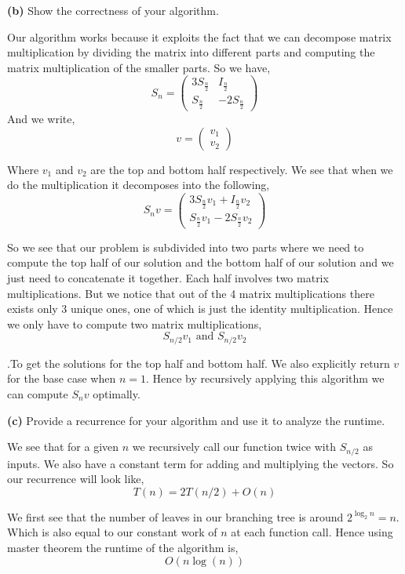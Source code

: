 \documentclass[12pt]{article}
\newcommand{\question}[3][Q]{
\begin{description}
\item \textbf{#1{#2}} #3
\end{description}
}
\begin{document}
\question[]{(b)}{
    Show the correctness of your algorithm.
}
\begin{answer}
    Our algorithm works because it exploits the fact that we can decompose matrix multiplication by dividing the matrix into different parts and computing the matrix multiplication of the smaller parts. So we have, 
    $$  $$ 
    $$S_n = \begin{pmatrix} 
        3S_{\frac{n}{2}} & I_{\frac{n}{2}} \\
        S_{\frac{n}{2}} & -2S_{\frac{n}{2}}
    \end{pmatrix}
    $$
    And we write, 
    $$ v = \begin{pmatrix} v_1 \\ v_2 \end{pmatrix} $$ 

    Where $v_1$ and $v_2$ are the top and bottom half respectively. We see that when we do the multiplication it decomposes into the following, 
        $$S_n v = \begin{pmatrix} 3S_{\frac{n}{2}}v_1 + I_{\frac{n}{2}} v_2 \\  
        S_{\frac{n}{2}}v_1  -2S_{\frac{n}{2}}v_2 \end{pmatrix}
        $$ 

        So we see that our problem is subdivided into two parts where we need to compute the top half of our solution and the bottom half of our solution and we just need to concatenate it together. Each half involves two matrix multiplications. But we notice that out of the 4 matrix multiplications there exists only 3 unique ones, one of which is just the identity multiplication. Hence we only have to compute two matrix multiplications, 
        $$  S_{n /2}v_1 \text{ and } S_{n /2} v_2$$ 

.To get the solutions for the top half and bottom half. We also explicitly return $v$ for the base case when  $n = 1$. Hence by recursively applying this algorithm we can compute $S_{n}v$ optimally.

\end{answer}

\question[]{(c)}{
    Provide a recurrence for your algorithm and use it to analyze the runtime.
}
\begin{answer}
    We see that for a given $n$ we recursively call  our function twice with $S_{n /2}$ as inputs. We also have a constant term for adding and multiplying the vectors. So our recurrence will look like, 
    $$ T(n) = 2T(n /2) + O(n) $$ 

    We first see that the number of leaves in our branching tree is around $2^{\log_2{n}} = n$. Which is also equal to our constant work of $n$ at each function call. Hence using master theorem the runtime of the algorithm is, 
    $$ O(n \log(n)) $$ 
\end{answer}
\end{document}
